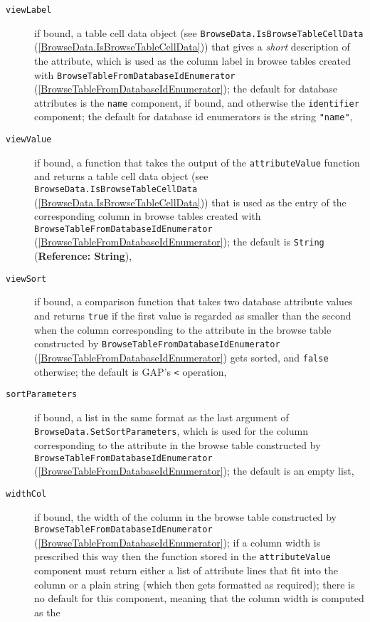 \documentclass[a4paper,11pt]{report}
\begin{document}
{{{ 
\begin{description}
\item[{\texttt{viewLabel}}]  if bound, a table cell data object (see \texttt{BrowseData.IsBrowseTableCellData} (\ref{BrowseData.IsBrowseTableCellData})) that gives a \emph{short} description of the attribute, which is used as the column label in browse
tables created with \texttt{BrowseTableFromDatabaseIdEnumerator} (\ref{BrowseTableFromDatabaseIdEnumerator}); the default for database attributes is the \texttt{name} component, if bound, and otherwise the \texttt{identifier} component; the default for database id enumerators is the string \texttt{"name"}, 
\item[{\texttt{viewValue}}]  if bound, a function that takes the output of the \texttt{attributeValue} function and returns a table cell data object (see \texttt{BrowseData.IsBrowseTableCellData} (\ref{BrowseData.IsBrowseTableCellData})) that is used as the entry of the corresponding column in browse tables
created with \texttt{BrowseTableFromDatabaseIdEnumerator} (\ref{BrowseTableFromDatabaseIdEnumerator}); the default is \texttt{String} (\textbf{Reference: String}), 
\item[{\texttt{viewSort}}]  if bound, a comparison function that takes two database attribute values and
returns \texttt{true} if the first value is regarded as smaller than the second when the column
corresponding to the attribute in the browse table constructed by \texttt{BrowseTableFromDatabaseIdEnumerator} (\ref{BrowseTableFromDatabaseIdEnumerator}) gets sorted, and \texttt{false} otherwise; the default is \textsf{GAP}'s \texttt{\texttt{}{\textless}} operation, 
\item[{\texttt{sortParameters}}]  if bound, a list in the same format as the last argument of  \texttt{BrowseData.SetSortParameters}, which is used for the column corresponding to the attribute in the browse
table constructed by \texttt{BrowseTableFromDatabaseIdEnumerator} (\ref{BrowseTableFromDatabaseIdEnumerator}); the default is an empty list, 
\item[{\texttt{widthCol}}]  if bound, the width of the column in the browse table constructed by \texttt{BrowseTableFromDatabaseIdEnumerator} (\ref{BrowseTableFromDatabaseIdEnumerator}); if a column width is prescribed this way then the function stored in the \texttt{attributeValue} component must return either a list of attribute lines that fit into the
column or a plain string (which then gets formatted as required); there is no
default for this component, meaning that the column width is computed as the

\end{description}}}}
\end{document}
